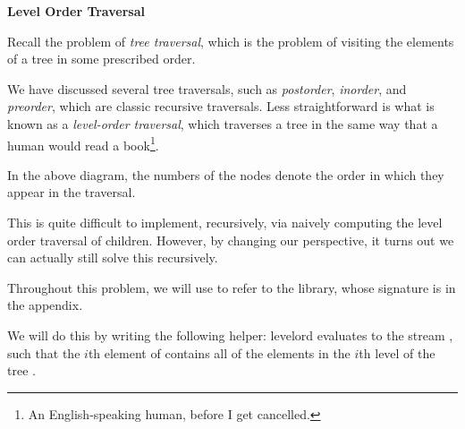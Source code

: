 \newpage


\textbf{Level Order Traversal}

Recall the problem of \textit{tree traversal}, which is the problem of visiting
the elements of a tree in some prescribed order.

We have discussed several tree traversals, such as \textit{postorder},
\textit{inorder}, and \textit{preorder}, which are classic recursive traversals.
Less straightforward is what is known as a \textit{level-order traversal}, which
traverses a tree in the same way that a human would read a book\footnote{An English-speaking
human, before I get cancelled.}.

\begin{center}
\end{center}

In the above diagram, the numbers of the nodes denote the order in which
they appear in the traversal.

This is quite difficult to implement, recursively, via naively computing
the level order traversal of children. However, by changing our perspective,
it turns out we can actually still solve this recursively.

Throughout this problem, we will use  to refer to the 
library, whose signature is in the appendix.

We will do this by writing the following helper:
\spec
  {levelord}
  {}
  {}
  { evaluates to the stream , such that the
  $i$th element of  contains all of the elements in the $i$th
  level of the tree .}


